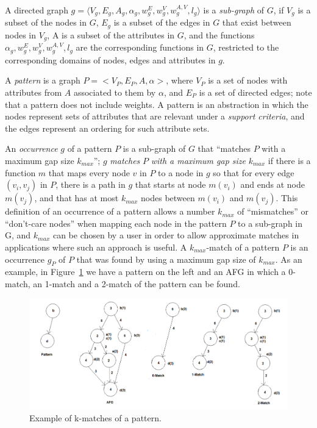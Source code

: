 A directed graph $g = \langle V_g, E_g, A_g, \alpha_g, w_g^E, w_g^V, w_g^{A,V}, l_g \rangle$ is a \emph{sub-graph} of $G$, if $V_g$ is a subset of the nodes in $G$, $E_g$ is a subset of the edges in $G$ that exist between nodes in $V_g$, A is a subset of the attributes in $G$, and the functions $\alpha_g, w_g^E, w_g^V, w_g^{A,V}, l_g$ are the corresponding functions in $G$, restricted to the corresponding domains of nodes, edges and attributes in $g$. 

A \emph{pattern} is a graph $P = <V_P, E_P, A, \alpha>$, where $V_P$ is a set of nodes with attributes from $A$ associated to them by $\alpha$, and $E_P$ is a set of directed edges; note that a pattern does not include weights.  A pattern is an abstraction in which the nodes represent sets of attributes that are relevant under a \emph{support criteria}, and the edges represent an ordering for such attribute sets.

An \emph{occurrence} $g$ of a pattern $P$ is a sub-graph of $G$ that ``matches $P$ with a maximum gap size $k_{max}$''; $g$ \emph{matches} $P$ \emph{with a maximum gap size} $k_{max}$ if there is a function $m$ that maps every node $v$ in $P$ to a node in $g$ so that for every edge $(v_i, v_j)$ in $P$, there is a path in $g$ that starts at node $m(v_i)$ and ends at node $m(v_j)$, and that has at most $k_{max}$ nodes between $m(v_i)$ and $m(v_j)$. This definition of an occurrence of a pattern allows a number $k_{max}$ of ``mismatches'' or ``don't-care nodes'' when mapping each node in the pattern $P$ to a sub-graph in G, and $k_{max}$ can be chosen by a user in order to allow approximate matches in applications where such an approach is useful. A $k_{max}$-match of a pattern $P$ is an occurrence $g_P$ of $P$ that was found by using a maximum gap size of $k_{max}$. As an example, in Figure~\ref{fig:GapExample} we have a pattern on the left and an AFG in which a 0-match, an 1-match and a 2-match of the pattern can be found. 

\begin{figure}[h!]
\centering
      \includegraphics[scale=0.25]{figures/match_example.pdf}
    \caption{Example of k-matches of a pattern.}
    \label{fig:GapExample}  
\end{figure}

